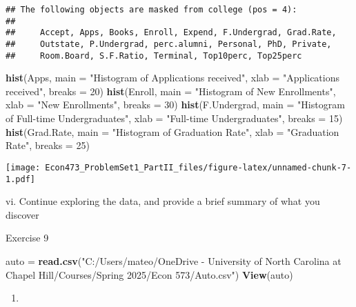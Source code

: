 \documentclass[
]{article}
\newenvironment{Shaded}{\begin{snugshade}}{\end{snugshade}}
\newcommand{\AttributeTok}[1]{\textcolor[rgb]{0.13,0.29,0.53}{#1}}
\newcommand{\DecValTok}[1]{\textcolor[rgb]{0.00,0.00,0.81}{#1}}
\newcommand{\FunctionTok}[1]{\textcolor[rgb]{0.13,0.29,0.53}{\textbf{#1}}}
\newcommand{\NormalTok}[1]{#1}
\newcommand{\OtherTok}[1]{\textcolor[rgb]{0.56,0.35,0.01}{#1}}
\newcommand{\StringTok}[1]{\textcolor[rgb]{0.31,0.60,0.02}{#1}}
\providecommand{\tightlist}{%
  \setlength{\itemsep}{0pt}\setlength{\parskip}{0pt}}
\begin{document}
\begin{verbatim}
## The following objects are masked from college (pos = 4):
## 
##     Accept, Apps, Books, Enroll, Expend, F.Undergrad, Grad.Rate,
##     Outstate, P.Undergrad, perc.alumni, Personal, PhD, Private,
##     Room.Board, S.F.Ratio, Terminal, Top10perc, Top25perc
\end{verbatim}

\begin{Shaded}
\begin{Highlighting}[]
\FunctionTok{hist}\NormalTok{(Apps, }\AttributeTok{main =} \StringTok{"Histogram of Applications received"}\NormalTok{, }\AttributeTok{xlab =} \StringTok{"Applications received"}\NormalTok{, }\AttributeTok{breaks =} \DecValTok{20}\NormalTok{)}
\FunctionTok{hist}\NormalTok{(Enroll, }\AttributeTok{main =} \StringTok{"Histogram of New Enrollments"}\NormalTok{, }\AttributeTok{xlab =} \StringTok{"New Enrollments"}\NormalTok{, }\AttributeTok{breaks =} \DecValTok{30}\NormalTok{)}
\FunctionTok{hist}\NormalTok{(F.Undergrad, }\AttributeTok{main =} \StringTok{"Histogram of Full{-}time Undergraduates"}\NormalTok{, }\AttributeTok{xlab =} \StringTok{"Full{-}time Undergraduates"}\NormalTok{, }\AttributeTok{breaks =} \DecValTok{15}\NormalTok{)}
\FunctionTok{hist}\NormalTok{(Grad.Rate, }\AttributeTok{main =} \StringTok{"Histogram of Graduation Rate"}\NormalTok{, }\AttributeTok{xlab =} \StringTok{"Graduation Rate"}\NormalTok{, }\AttributeTok{breaks =} \DecValTok{25}\NormalTok{)}
\end{Highlighting}
\end{Shaded}

\texttt{[image: Econ473\_ProblemSet1\_PartII\_files/figure-latex/unnamed-chunk-7-1.pdf]}

vi. Continue exploring the data, and provide a brief summary of what you
discover

Exercise 9

\begin{Shaded}
\begin{Highlighting}[]
\NormalTok{auto }\OtherTok{=} \FunctionTok{read.csv}\NormalTok{(}\StringTok{"C:/Users/mateo/OneDrive {-} University of North Carolina at Chapel Hill/Courses/Spring 2025/Econ 573/Auto.csv"}\NormalTok{)}
\FunctionTok{View}\NormalTok{(auto)}
\end{Highlighting}
\end{Shaded}

\begin{enumerate}
\def\labelenumi{(\alph{enumi})}
\tightlist
\item
\end{enumerate}
\end{document}
